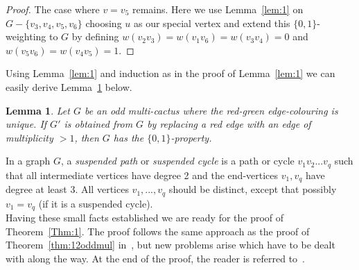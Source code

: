 \documentclass[
final,
 nomarks,
]{dmtcs-episciences}
\newtheorem{lemma}[theorem]{Lemma}
\theoremstyle{definition}
\begin{document}
\begin{proof}
The case where $v=v_5$ remains. Here we use Lemma~\ref{lem:1} on  $G- \{v_3, v_4, v_5, v_6\}$ choosing $u$ as our special vertex and extend this $\{0,1\}$-weighting to $G$ by defining $w(v_2v_3)=w(v_1v_6)=w(v_3v_4)=0$ and $w(v_5v_6)=w(v_4v_5)=1$. 
\end{proof}

\noindent Using Lemma~\ref{lem:1} and induction as in the proof of Lemma~\ref{lem:1} we can easily derive Lemma~\ref{lem:3} below.
\begin{lemma} \label{lem:3}
Let $G$ be an odd multi-cactus where the red-green edge-colouring is unique. If $G'$ is obtained from $G$ by replacing a red edge with an edge of multiplicity $> 1$, then $G$ has the $\{0,1\}$-property.
\end{lemma}
\noindent In a graph $G$, a \textit{suspended path} or \textit{suspended cycle} is a path or cycle $v_1v_2...v_q$ such that all intermediate vertices have degree 2 and the end-vertices $v_1,v_q$ have degree at least 3. All vertices $v_1,...,v_q$ should be distinct, except that possibly $v_1=v_q$ (if it is a suspended cycle). \\
Having these small facts established we are ready for the proof of Theorem~\ref{Thm:1}. The proof follows the same approach as the proof of Theorem~\ref{thm:12oddmul} in~\cite{TWZ}, but new problems arise which have to be dealt with along the way. At the end of the proof, the reader is referred to~\cite{TWZ}.
\end{document}
